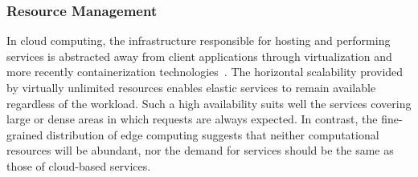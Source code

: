 

\subsubsection*{Resource Management}\label{sec:efficiency}


In cloud computing, the infrastructure responsible for hosting and performing services is abstracted away from client applications through virtualization and more recently containerization technologies~\cite{leitner2016patterns, Quatrocchi2016discrete}. The horizontal scalability provided by virtually unlimited resources enables elastic services to remain available regardless of the workload.
Such a high availability suits well the services covering large or dense areas in which requests are always expected. In contrast, the fine-grained distribution of edge computing suggests that neither computational resources will be abundant, nor the demand for services should be the same as those of cloud-based services. 

